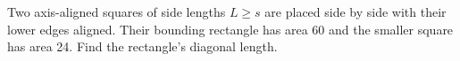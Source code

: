 Two axis-aligned squares of side lengths $ L\ge s $ are placed side by side with their lower edges aligned. Their bounding rectangle has area 60 and the smaller square has area 24. Find the rectangle's diagonal length.

